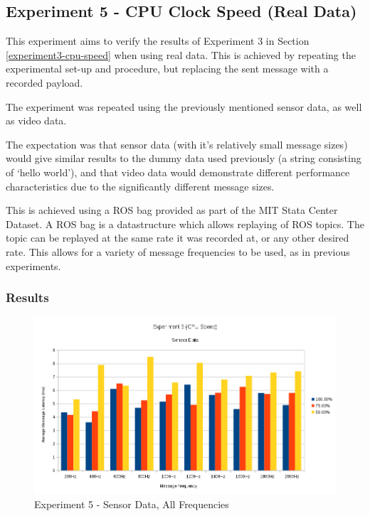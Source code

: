 \documentclass[../dissertation.tex]{subfiles}
\begin{document}
\subsection{Experiment 5 - CPU Clock Speed (Real Data)}

This experiment aims to verify the results of Experiment 3 in Section \ref{experiment3-cpu-speed} when using real data. This is achieved by repeating the experimental set-up and procedure, but replacing the sent message with a recorded payload.

The experiment was repeated using the previously mentioned sensor data, as well as video data.

The expectation was that sensor data (with it's relatively small message sizes) would give similar results to the dummy data used previously (a string consisting of `hello world'), and that video data would demonstrate different performance characteristics due to the significantly different message sizes.

This is achieved using a ROS bag provided as part of the MIT Stata Center Dataset. A ROS bag is a datastructure which allows replaying of ROS topics. The topic can be replayed at the same rate it was recorded at, or any other desired rate. This allows for a variety of message frequencies to be used, as in previous experiments.

\subsubsection{Results}

\begin{figure}[H]
\centering
\includegraphics[width=\textwidth]{images/experiment5/sensor_data_all_freqs.png}
\caption{Experiment 5 - Sensor Data, All Frequencies}
\label{exp5-sensor-means-all-freq}
\end{figure}
\end{document}
